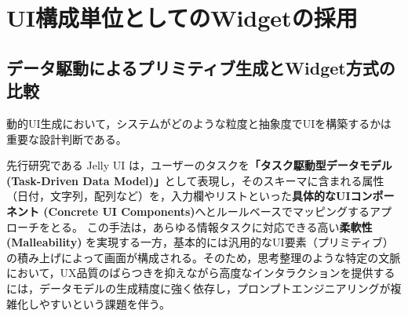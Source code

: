 \documentclass[senior,final,11pt,dvipdfmx]{iputit-thesis}
\begin{document}




\section{UI構成単位としてのWidgetの採用}
\label{sec:why_widget}

\subsection{データ駆動によるプリミティブ生成とWidget方式の比較}
動的UI生成において，システムがどのような粒度と抽象度でUIを構築するかは重要な設計判断である。

先行研究である Jelly UI\cite{cao2025jelly} は，ユーザーのタスクを\textbf{「タスク駆動型データモデル (Task-Driven Data Model)」}として表現し，そのスキーマに含まれる属性（日付，文字列，配列など）を，入力欄やリストといった\textbf{具体的なUIコンポーネント (Concrete UI Components)}へとルールベースでマッピングするアプローチをとる。
この手法は，あらゆる情報タスクに対応できる高い\textbf{柔軟性 (Malleability)} を実現する一方，基本的には汎用的なUI要素（プリミティブ）の積み上げによって画面が構成される。そのため，思考整理のような特定の文脈において，UX品質のばらつきを抑えながら高度なインタラクションを提供するには，データモデルの生成精度に強く依存し，プロンプトエンジニアリングが複雑化しやすいという課題を伴う。
\end{document}
